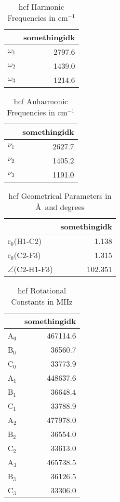 \begin{table}
\centering
\caption{hcf Harmonic Frequencies in cm$^{-1}$}
\label{hcf_harm}
\begin{tabular}{lr}
\toprule
 & somethingidk \\
\midrule
$\omega_{1}$ & 2797.6 \\
$\omega_{2}$ & 1439.0 \\
$\omega_{3}$ & 1214.6 \\
\bottomrule
\end{tabular}
\end{table}
\begin{table}
\centering
\caption{hcf Anharmonic Frequencies in cm$^{-1}$}
\label{hcf_anharm}
\begin{tabular}{lr}
\toprule
 & somethingidk \\
\midrule
$\nu_{1}$ & 2627.7 \\
$\nu_{2}$ & 1405.2 \\
$\nu_{3}$ & 1191.0 \\
\bottomrule
\end{tabular}
\end{table}
\begin{table}
\centering
\caption{hcf Geometrical Parameters in \AA~and degrees}
\label{hcf_geos}
\begin{tabular}{lr}
\toprule
 & somethingidk \\
\midrule
r$_0$(H1-C2) & 1.138 \\
r$_0$(C2-F3) & 1.315 \\
$\angle$(C2-H1-F3) & 102.351 \\
\bottomrule
\end{tabular}
\end{table}
\begin{table}
\centering
\caption{hcf Rotational Constants in MHz}
\label{hcf_rots}
\begin{tabular}{lr}
\toprule
 & somethingidk \\
\midrule
A$_0$ & 467114.6 \\
B$_0$ & 36560.7 \\
C$_0$ & 33773.9 \\
A$_1$ & 448637.6 \\
B$_1$ & 36648.4 \\
C$_1$ & 33788.9 \\
A$_2$ & 477978.0 \\
B$_2$ & 36554.0 \\
C$_2$ & 33613.0 \\
A$_3$ & 465738.5 \\
B$_3$ & 36126.5 \\
C$_3$ & 33306.0 \\
\bottomrule
\end{tabular}
\end{table}
